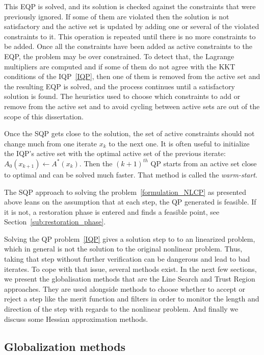 This EQP is solved, and its solution is checked against the constraints that were previously ignored.
If some of them are violated then the solution is not satisfactory and the active set is updated by adding one or several of the violated constraints to it.
This operation is repeated until there is no more constraints to be added.
Once all the constraints have been added as active constraints to the EQP, the problem may be over constrained.
To detect that, the Lagrange multipliers are computed and if some of them do not agree with the KKT conditions of the IQP~\ref{IQP}, then one of them is removed from the active set and the resulting EQP is solved, and the process continues until a satisfactory solution is found.
The heuristics used to choose which constraints to add or remove from the active set and to avoid cycling between active sets are out of the scope of this dissertation.

Once the SQP gets close to the solution, the set of active constraints should not change much from one iterate $x_k$ to the next one.
It is often useful to initialize the IQP's active set with the optimal active set of the previous iterate: $\mathit{A}_0(x_{k+1})\leftarrow\mathit{A}^*(x_k)$. Then the ${(k+1)}^{th}$ QP starts from an active set close to optimal and can be solved much faster.
That method is called the \textit{warm-start}.

The SQP approach to solving the problem~\ref{formulation_NLCP} as presented above leans on the assumption that at each step, the QP generated is feasible.
If it is not, a restoration phase is entered and finds a feasible point, see Section~\ref{sub:restoration_phase}.

Solving the QP problem~\ref{IQP} gives a solution step to to an linearized problem, which in general is not the solution to the original nonlinear problem.
Thus, taking that step without further verification can be dangerous and lead to bad iterates.
To cope with that issue, several methods exist.
In the next few sections, we present the globalisation methods that are the Line Search and Trust Region approaches.
They are used alongside methods to choose whether to accept or reject a step like the merit function and filters in order to monitor the length and direction of the step with regards to the nonlinear problem.
And finally we discuss some Hessian approximation methods.

\subsection{Globalization methods}
\label{sub:globalization_methods}

